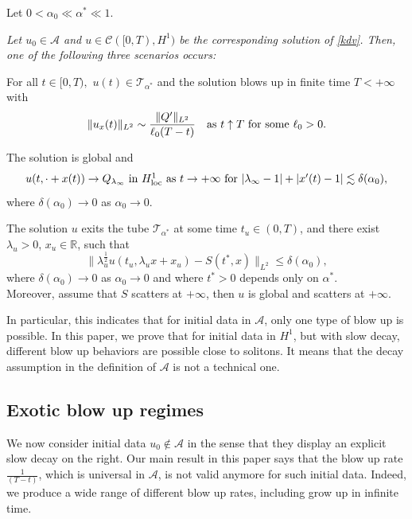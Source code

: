 \documentclass[11pt,a4paper,reqno]{amsart}
\theoremstyle{remark}
\numberwithin{equation}{section}
\newcommand{\be}{\begin{equation}}
\newcommand{\ee}{\end{equation}}
\def\RR{\mathbb{R}}
\def\RR{\mathbb{R}}
\def\l{\lambda}
\begin{document}
Let $0<\alpha_0\ll\alpha^*\ll 1$.
{\sl Let   $u_0 \in \mathcal{A}$ and 
  $u \in \mathcal C ([0,T),H^1)$ be the corresponding solution of \eqref{kdv}.
Then, one of the following three scenarios occurs:


\medskip

  For all $t\in [0,T),$ $u(t)\in \mathcal{T}_{\alpha^*}$ and the solution blows up in finite time $T<+\infty$ with
\be\label{papI1}
\|u_x(t)\|_{L^2} \sim \frac {\|Q'\|_{L^2}}{\ell_0 (T-t)} \quad \hbox{as $t\uparrow T$ for some $\ell_0>0$.} 
\ee
 

  The solution is global and
\begin{equation}
  u(t,  \cdot +x(t))\to Q_{\l_\infty} \hbox{ in $H^1_{\rm loc}$ as $t\to +\infty$ for  $|\l_\infty-1| + |x'(t)-1|\lesssim \delta(\alpha_0)$},
\end{equation} 
where $\delta(\alpha_0)\to 0$  as $\alpha_0\to 0$.
\smallskip


 The solution  $u$ exits the tube   $\mathcal{T}_{\alpha^*}$ at some time  $t_u\in (0,T)$, and  there exist    $\l_u>0$, $x_u\in \RR$,  such that
$$\| {\l_u^{\frac 12}} u(t_u, \l_u x+x_u) - S(t^*,x)\|_{L^2} \leq \delta(\alpha_0),$$
where $\delta(\alpha_0)\to 0$  as $\alpha_0\to 0$ and where $t^*>0$ depends only on $\alpha^*$.\\
Moreover, assume that $S$ scatters at $+\infty$, then  $u$ is global  and scatters at $+\infty$.
  }
  
  \medskip
  
In particular, this   indicates that for initial data in $\mathcal{A}$, only one type of blow up is possible. In this paper, we prove that for initial data in $H^1$, but   with slow decay, different blow up behaviors are possible close to solitons.
It means that the decay assumption in the definition of $\mathcal A$ is not a technical one.

 
 
 
 
\subsection{Exotic blow up regimes}
We now consider initial data $u_0\not \in \mathcal{A}$ in the sense that they display an explicit slow decay on the right. Our main result in this paper says that the  blow up rate $\frac 1{(T-t)}$, which is universal in $\mathcal A$, is not valid anymore for such initial data. Indeed, we  produce a wide range of different blow up rates, including grow up in infinite time.
\end{document}
